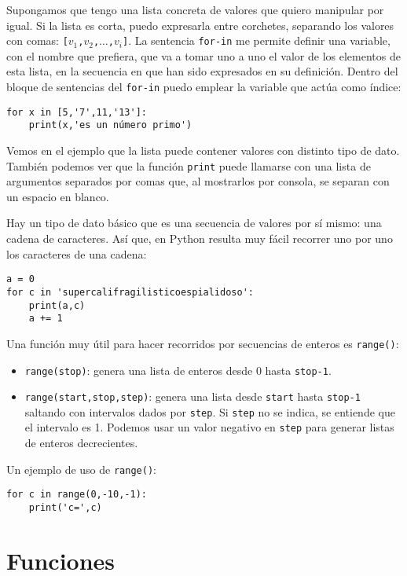 Supongamos que tengo una lista concreta de valores que quiero manipular por igual. Si la lista es corta, puedo expresarla entre corchetes, separando los valores con comas: \texttt{[$v_1$,$v_2$,$\ldots$,$v_i$]}. La sentencia \texttt{for-in} me permite definir una variable, con el nombre que prefiera, que va a tomar uno a uno el valor de los elementos de esta lista, en la secuencia en que han sido expresados en su definición. Dentro del bloque de sentencias del \texttt{for-in} puedo emplear la variable que actúa como índice:

\begin{lstlisting}
for x in [5,'7',11,'13']:
    print(x,'es un número primo')
\end{lstlisting}

Vemos en el ejemplo que la lista puede contener valores con distinto tipo de dato. También podemos ver que la función \texttt{print} puede llamarse con una lista de argumentos separados por comas que, al mostrarlos por consola, se separan con un espacio en blanco. 

Hay un tipo de dato básico que es una secuencia de valores por sí mismo: una cadena de caracteres. Así que, en Python resulta muy fácil recorrer uno por uno los caracteres de una cadena:

\begin{lstlisting}
a = 0
for c in 'supercalifragilisticoespialidoso':
    print(a,c)
    a += 1
\end{lstlisting}

Una función muy útil para hacer recorridos por secuencias de enteros es \texttt{range()}:
\begin{itemize}
	\item \texttt{range(stop)}: genera una lista de enteros desde 0 hasta \texttt{stop-1}.
	\item \texttt{range(start,stop,step)}: genera una lista desde \texttt{start} hasta \texttt{stop-1} saltando con intervalos dados por \texttt{step}. Si \texttt{step} no se indica, se entiende que el intervalo es 1. Podemos usar un valor negativo en \texttt{step} para generar listas de enteros decrecientes.
\end{itemize}

Un ejemplo de uso de \texttt{range()}:
\begin{lstlisting}
for c in range(0,-10,-1):
    print('c=',c)
\end{lstlisting}

\section{Funciones}

